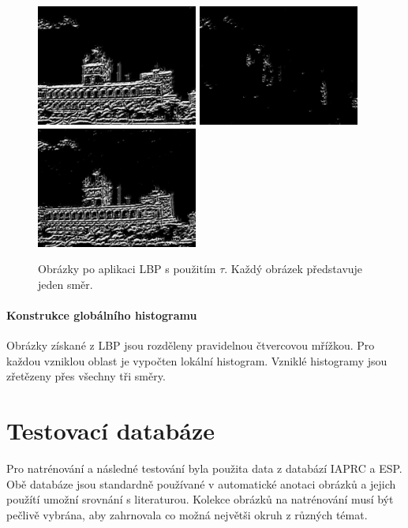 \documentclass[czech,BP]{thesiskiv}
\begin{document}
\begin{figure}[H]
	\centering
	\includegraphics[width=150pt]{./img/lbp_3_1.jpg}
	\includegraphics[width=150pt]{./img/lbp_3_2.jpg}
	\includegraphics[width=150pt]{./img/lbp_3_3.jpg}
	\caption{Obrázky po aplikaci LBP s použitím $\tau$. Každý obrázek představuje jeden směr.}
\end{figure}

\subsubsection{Konstrukce globálního histogramu}
\par Obrázky získané z LBP jsou rozděleny pravidelnou čtvercovou mřížkou. Pro každou vzniklou oblast je vypočten lokální histogram. Vzniklé histogramy jsou zřetězeny přes všechny tři směry.

\chapter{Testovací databáze}
\par Pro natrénování a následné testování byla použita data z databází IAPRC a ESP. Obě databáze jsou standardně používané v automatické anotaci obrázků a jejich použítí umožní srovnání s literaturou. Kolekce obrázků na natrénování musí být pečlivě vybrána, aby zahrnovala co možná největši okruh z různých témat. 
\end{document}
